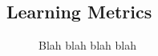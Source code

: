 \documentclass[../main.tex]{subfiles}
\begin{document}
\subsection{Learning Metrics}

\begin{figure}[H]
    \makebox[\linewidth][c]{%
        \centering
        \texttt{[image: ]}
        }
    \caption{Blah blah blah blah}\label{fig:behavior}
\end{figure}
\end{document}
